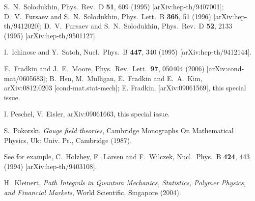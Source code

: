 \documentclass[11pt]{article}
\begin{document}
\begin{thebibliography}{99}
S.~N.~Solodukhin,
  Phys.\ Rev.\ D {\bf 51}, 609 (1995)
  [arXiv:hep-th/9407001]; 
  D.~V.~Fursaev and S.~N.~Solodukhin,
  Phys.\ Lett.\  B {\bf 365}, 51 (1996)
  [arXiv:hep-th/9412020];
  D.~V.~Fursaev and S.~N.~Solodukhin,
  Phys.\ Rev.\  D {\bf 52}, 2133 (1995)
  [arXiv:hep-th/9501127].

  I.~Ichinose and Y.~Satoh,
  Nucl.\ Phys.\  B {\bf 447}, 340 (1995)
  [arXiv:hep-th/9412144].



 
  E.~Fradkin and J.~E.~Moore,
  Phys.\ Rev.\ Lett.\  {\bf 97}, 050404 (2006)
  [arXiv:cond-mat/0605683]; 
  B.~Hsu, M.~Mulligan, E.~Fradkin and E.~A.~Kim,
  arXiv:0812.0203 [cond-mat.stat-mech];
 E. Fradkin, [arXiv:09061569], this special issue.

I. Peschel, V. Eisler, arXiv:09061663, this special issue.



  S.~Pokorski,
  {\sl Gauge field theories}, Cambridge Monographs On Mathematical Physics,
Uk: Univ. Pr., Cambridge (1987). 


 See for example, C.~Holzhey, F.~Larsen and F.~Wilczek,
 Nucl.\ Phys.\ B {\bf 424}, 443 (1994)
 [arXiv:hep-th/9403108].

  H.~Kleinert,
  {\sl Path Integrals in Quantum Mechanics,  Statistics, Polymer Physics,
  and Financial Markets}, 
  World Scientific, Singapore (2004).


\end{thebibliography}
\end{document}
